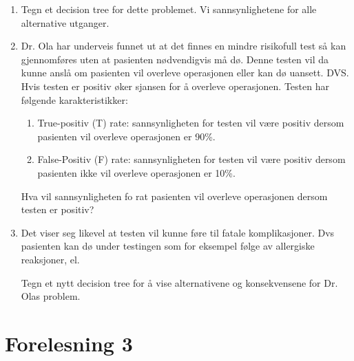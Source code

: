 		\begin{enumerate}
			\item Tegn et decision tree for dette problemet. Vi sannsynlighetene for alle alternative
			utganger.
			\item Dr. Ola har underveis funnet ut at det finnes en mindre risikofull test så kan
			gjennomføres uten at pasienten nødvendigvis må dø. Denne testen vil da kunne anslå om pasienten
			vil overleve operasjonen eller kan dø uansett. DVS. Hvis testen er positiv øker sjansen for å 
			overleve operasjonen. Testen har følgende karakteristikker:
			 	\begin{enumerate}
			 		\item True-positiv (T) rate: sannsynligheten for testen vil være positiv dersom
			 		pasienten vil overleve operasjonen er 90\%.
			 		\item False-Positiv (F) rate: sannsynligheten for testen vil være positiv dersom pasienten
			 		ikke vil overleve operasjonen er 10\%. 
			 	\end{enumerate}
			Hva vil sannsynligheten fo rat pasienten vil overleve operasjonen dersom testen er positiv?
			\item Det viser seg likevel at testen vil kunne føre til fatale komplikasjoner. Dvs pasienten
			kan dø under testingen som for eksempel følge av allergiske reaksjoner, el.

			Tegn et nytt decision tree for å vise alternativene og konsekvensene for Dr. Olas problem.
		\end{enumerate}

	\section{Forelesning 3}

